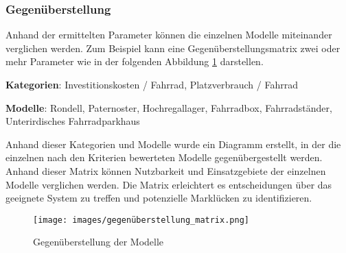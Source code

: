 \subsubsection{Gegenüberstellung}

Anhand der ermittelten Parameter können die einzelnen Modelle miteinander verglichen werden. Zum Beispiel kann eine Gegenüberstellungsmatrix zwei oder mehr Parameter wie in der folgenden Abbildung \ref{fig:gegenueberstellung} darstellen.

\textbf{Kategorien}: Investitionskosten / Fahrrad, Platzverbrauch / Fahrrad

\textbf{Modelle}: Rondell, Paternoster, Hochregallager, Fahrradbox, Fahrradständer, Unterirdisches Fahrradparkhaus

Anhand dieser Kategorien und Modelle wurde ein Diagramm erstellt, in der die einzelnen nach den Kriterien bewerteten Modelle gegenübergestellt werden. Anhand dieser Matrix können Nutzbarkeit und Einsatzgebiete der einzelnen Modelle verglichen werden. Die Matrix erleichtert es entscheidungen über das geeignete System zu treffen und potenzielle Marklücken zu identifizieren.

\begin{figure}[H]
  \centering
  \texttt{[image: images/gegenüberstellung\_matrix.png]}
  \caption{Gegenüberstellung der Modelle}
  \label{fig:gegenueberstellung}
\end{figure}